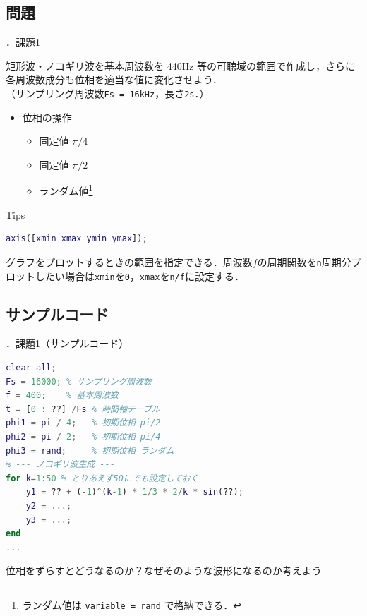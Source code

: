 \documentclass[aspectratio=43]{beamer}
\newcommand{\showsec}{\thesection ．}
\begin{document}
\subsection{問題}
\begin{frame}[t,containsverbatim]{\showsec 課題1}
    \begin{exampleblock}{}
        矩形波・ノコギリ波を基本周波数を 440Hz 等の可聴域の範囲で作成し，さらに各周波数成分も位相を適当な値に変化させよう．\\
        （サンプリング周波数\verb|Fs = 16kHz|，長さ\verb|2s|．）
        \begin{itemize}
            \item 位相の操作
                  \begin{itemize}
                      \item 固定値 \(\pi/4\)
                      \item 固定値 \(\pi/2\)
                      \item ランダム値\footnote{ランダム値は \texttt{variable = rand} で格納できる．}
                  \end{itemize}
        \end{itemize}
    \end{exampleblock}
    \begin{block}{Tips}
        \begin{lstlisting}[language={Matlab},numbers={none},frame={none},xleftmargin=0em]
axis([xmin xmax ymin ymax]);
        \end{lstlisting}
        グラフをプロットするときの範囲を指定できる．周波数\(f\)の周期関数を\texttt{n}周期分プロットしたい場合は\texttt{xmin}を\texttt{0}，\texttt{xmax}を\texttt{n/f}に設定する．
    \end{block}
\end{frame}
\subsection{サンプルコード}
\begin{frame}[t,containsverbatim]{\showsec 課題1（サンプルコード）}
    \begin{lstlisting}[language={Matlab}]
clear all;
Fs = 16000; % サンプリング周波数
f = 400;    % 基本周波数
t = [0 : ??] /Fs % 時間軸テーブル
phi1 = pi / 4;   % 初期位相 pi/2
phi2 = pi / 2;   % 初期位相 pi/4
phi3 = rand;     % 初期位相 ランダム
% --- ノコギリ波生成 ---
for k=1:50 % とりあえず50にでも設定しておく
    y1 = ?? + (-1)^(k-1) * 1/3 * 2/k * sin(??);
    y2 = ...;
    y3 = ...;
end
...
\end{lstlisting}
    \begin{block}{}
        位相をずらすとどうなるのか？なぜそのような波形になるのか考えよう
    \end{block}
\end{frame}
\end{document}
